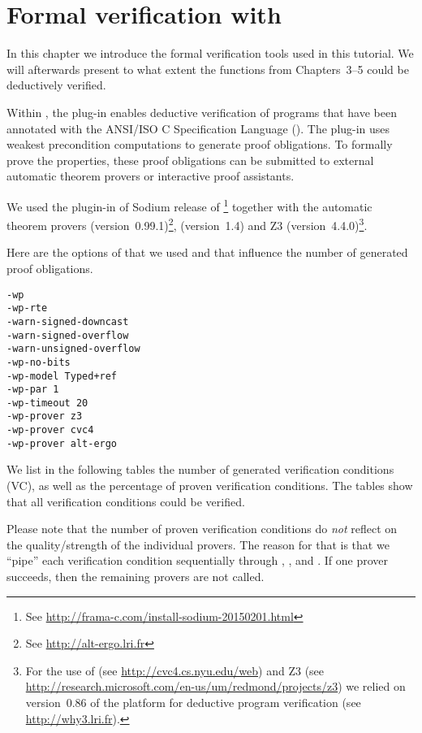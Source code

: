 
\chapter{Formal verification with \framacwp}
\label{cha:formal-verification}


In this chapter we introduce the formal verification tools used in this tutorial.
We will afterwards present to what extent the functions from
Chapters~3--5 could be deductively verified.

Within \framac, the \wpframac plug-in \cite{wp} enables deductive verification of \isoc programs that have been annotated with the ANSI\slash ISO C Specification Language (\acsl)\cite{acsl}.
The \wpframac plug-in uses weakest precondition computations to generate proof obligations.
To formally prove the \acsl properties, these proof obligations can be submitted to external automatic theorem provers or interactive proof assistants.

We used the \wpframac plugin-in of Sodium release of \framac\footnote{%
 See \url{http://frama-c.com/install-sodium-20150201.html}
}
together with  the automatic theorem provers \altergo (version~0.99.1)\footnote{%
  See \url{http://alt-ergo.lri.fr}
},
\cvc (version~1.4) and Z3 (version~4.4.0)\footnote{%
  For the use of \cvc (see \url{http://cvc4.cs.nyu.edu/web})
  and Z3 (see \url{http://research.microsoft.com/en-us/um/redmond/projects/z3})
  we relied on version~0.86 of the \whythree platform for deductive
  program verification (see \url{http://why3.lri.fr}).
}.

Here are the options of \framac that we used and that influence the
number of generated proof obligations.

\begin{lstlisting}[style = func-decl]
-wp
-wp-rte
-warn-signed-downcast
-warn-signed-overflow
-warn-unsigned-overflow
-wp-no-bits
-wp-model Typed+ref
-wp-par 1
-wp-timeout 20 
-wp-prover z3
-wp-prover cvc4
-wp-prover alt-ergo
\end{lstlisting}


We list in the following tables the number of generated
verification conditions (VC), as well as the percentage of proven verification conditions.
The tables show that all verification conditions could be verified.

Please note that the number of proven verification conditions do \emph{not} reflect
on the quality\slash strength of the individual provers.
The reason for that is that we ``pipe'' each verification
condition sequentially through \wpqed, \z, \cvc and \altergo.
If one prover succeeds, then the remaining provers are not called.

